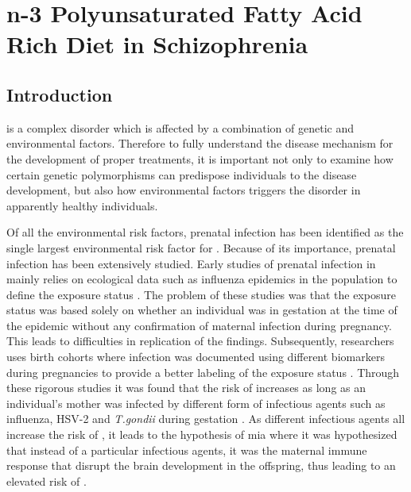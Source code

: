 \chapter{n-3 Polyunsaturated Fatty Acid Rich Diet in Schizophrenia}
\label{omegaProject}
\section{Introduction}
 is a complex disorder which is affected by a combination of genetic and environmental factors. 
Therefore to fully understand the disease mechanism for the development of proper treatments, it is important not only to examine how certain genetic polymorphisms can predispose individuals to the disease development, but also how environmental factors triggers the disorder in apparently healthy individuals.

Of all the environmental risk factors, prenatal infection has been identified as the single largest environmental risk factor for  \citep{Sullivan2005}.
Because of its importance, prenatal infection has been extensively studied.
Early studies of prenatal infection in  mainly relies on ecological data such as influenza epidemics in the population to define the exposure status \citep{Brown2010}.
The problem of these studies was that the exposure status was based solely on whether an individual was in gestation at the time of the epidemic without any confirmation of maternal infection during pregnancy.
This leads to difficulties in replication of the findings.
Subsequently, researchers uses birth cohorts where infection was documented using different biomarkers during pregnancies to provide a better labeling of the exposure status \citep{Brown2010}.
Through these rigorous studies it was found that the risk of  increases as long as an individual's mother was infected by different form of infectious agents such as influenza, HSV-2 and \textit{T.gondii} during gestation \citep{Brown2010}.
As different infectious agents all increase the risk of , it leads to the hypothesis of \gls{mia} \citep{Brown2010} where it was hypothesized that instead of a particular infectious agents, it was the maternal immune response that disrupt the brain development in the offspring, thus leading to an elevated risk of .

